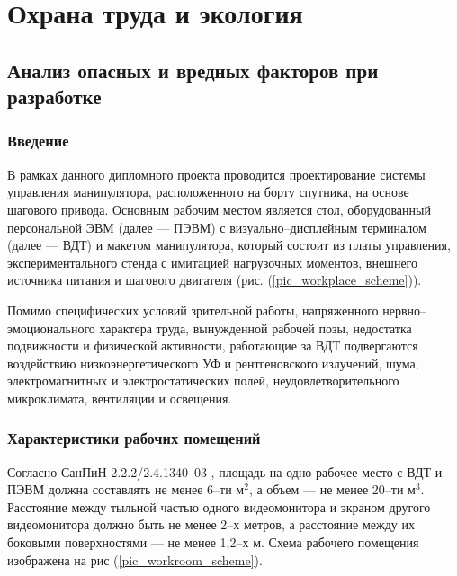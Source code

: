 \newpage
\section{Охрана труда и экология}

\subsection{Анализ опасных и вредных факторов при разработке}

\subsubsection{Введение}

В рамках данного дипломного проекта проводится проектирование системы управления
манипулятора, расположенного на борту спутника, на основе шагового привода.
Основным рабочим местом является стол, оборудованный персональной ЭВМ
(далее --- ПЭВМ) с визуально--дисплейным терминалом (далее --- ВДТ) и макетом
манипулятора, который состоит из платы управления, экспериментального стенда с
имитацией нагрузочных моментов, внешнего источника питания и шагового двигателя
(рис. (\ref{pic_workplace_scheme})).

Помимо специфических условий зрительной работы, напряженного
нервно--эмоционального характера труда, вынужденной рабочей позы, недостатка
подвижности и физической активности, работающие за ВДТ подвергаются воздействию
низкоэнергетического УФ и рентгеновского излучений, шума, электромагнитных и
электростатических полей, неудовлетворительного микроклимата, вентиляции и
освещения.

\subsubsection{Характеристики рабочих помещений}

Согласно СанПиН 2.2.2/2.4.1340--03 \cite{ecology_sanpin_1340_03}, площадь на одно
рабочее место с ВДТ и ПЭВМ должна составлять не менее 6--ти $\text{м}^2$, а объем
--- не менее 20--ти $\text{м}^3$. Расстояние между тыльной частью одного видеомонитора
и экраном другого видеомонитора должно быть не менее 2--х метров, а расстояние
между их боковыми поверхностями --- не менее 1,2--х м. Схема рабочего помещения
изображена на рис (\ref{pic_workroom_scheme}).

